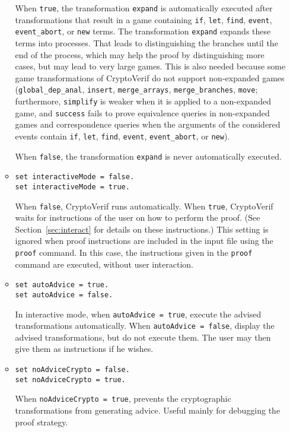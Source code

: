 \begin{itemize}
\begin{itemize}
When {\tt true}, the transformation \texttt{expand} is automatically
executed after transformations that result in a game containing
\texttt{if}, \texttt{let}, \texttt{find},
\texttt{event}, \texttt{event\_abort}, or \texttt{new} terms.
The transformation \texttt{expand} expands these terms into processes.
That leads to distinguishing the branches until the end of the process,
which may help the proof by distinguishing more cases, but
may lead to very large games.
This is also needed because some game transformations of CryptoVerif
do not support non-expanded games (\texttt{global\_dep\_anal},
\texttt{insert}, \texttt{merge\_arrays}, \texttt{merge\_branches}, \texttt{move};
furthermore, \texttt{simplify} is weaker when it is applied
to a non-expanded game, and \texttt{success} fails to prove
equivalence queries in non-expanded games and correspondence
queries when the arguments of the considered events contain
\texttt{if}, \texttt{let}, \texttt{find},
\texttt{event}, \texttt{event\_abort}, or \texttt{new}).

When {\tt false}, the transformation \texttt{expand} is never
automatically executed.

\item \texttt{set interactiveMode = false.}\\
\texttt{set interactiveMode = true.}

When {\tt false}, CryptoVerif runs automatically.
When {\tt true}, CryptoVerif waits for instructions of the user
on how to perform the proof. (See Section~\ref{sec:interact}
for details on these instructions.)
%
This setting is ignored when proof instructions are included
in the input file using the \texttt{proof} command.
In this case, the instructions given in the \texttt{proof} command
are executed, without user interaction.

\item \texttt{set autoAdvice = true.}\\
\texttt{set autoAdvice = false.}

In interactive mode, when \texttt{autoAdvice = true}, execute the
advised transformations automatically. When \texttt{autoAdvice = false},
display the advised transformations, but do not execute them.
The user may then give them as instructions if he wishes.

\item \texttt{set noAdviceCrypto = false.}\\
\texttt{set noAdviceCrypto = true.}

When \texttt{noAdviceCrypto = true}, prevents the cryptographic 
transformations from generating advice. Useful mainly for debugging
the proof strategy.


\end{itemize}
\end{itemize}
